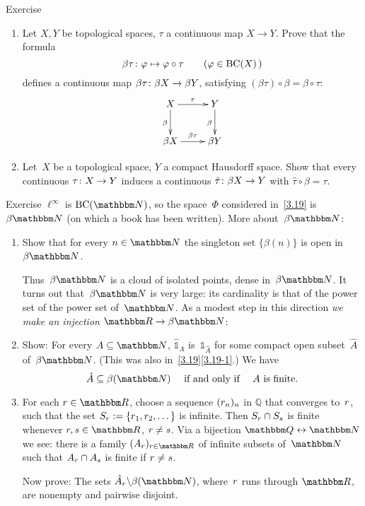 \documentclass[main.tex]{subfiles}
\begin{document}
%
%
\begin{psec}{4.14}{Exercise}
\begin{enumerate}
\item \label{4.14-1}
Let $X,Y$ be topological spaces,
$\tau$ a continuous map $X\rightarrow Y$.
Prove that the formula
\begin{equation*}
\beta\tau\colon\varphi\mapsto\varphi\circ\tau\qquad(\varphi\in\mathrm{BC}(X)\,)
\end{equation*}
defines a continuous map $\beta\tau\colon\beta X\rightarrow\beta Y$,
satisfying $(\beta\tau)\circ\beta=\beta\circ\tau$:
\begin{equation*}
\xymatrix{
X\ar[r]^\tau \ar[d]_\beta& Y\ar[d]_\beta \\
\beta X\ar[r]^{\beta\tau} & \beta Y
}
\end{equation*}
%
\item \label{4.14-2}
Let~$X$ be a topological space, 
$Y$ a compact Hausdorff space.
Show that every continuous $\tau\colon X\rightarrow Y$
induces a continuous $\hat\tau\colon\beta X\rightarrow Y$
with $\hat\tau\circ\beta=\tau$.
\end{enumerate}
\end{psec}
%
%
\begin{psec}{4.15}{Exercise}
$\ell^\infty$ is $\BCont{\N}$,
so the space~$\Phi$ considered in~\ref{3.19} is~$\beta\N$
(on which a book has been written).
More about~$\beta\N$:
\begin{enumerate}
\item \label{4.15-1}
Show that for every $n\in\N$
the singleton set $\{\beta(n)\}$ is open in~$\beta \N$.

Thus~$\beta\N$ is a cloud of isolated points,
dense in~$\beta\N$.
It turns out that~$\beta\N$ is very large:
its cardinality is
that of the power set of the power set of~$\N$.
As a modest step in this direction
\emph{we make an injection} $\R\ra\beta\N$:
\item \label{4.15-2}
Show: For every $A\subseteq \N$, 
$\hat{\mathbb 1}_A$ is~${\mathbb 1}_{\hat A}$
for some compact open subset~$\hat A$ of~$\beta\N$.
(This was also in~\ref{3.19}\ref{3.19-1}.) We have
\begin{equation*}
\hat A \subseteq \beta(\N)
\quad\htam{ if and only if }\quad 
A\htam{ is finite.}
\end{equation*}
%
\item \label{4.14-3}
For each $\sr\in \R$,
choose a sequence $(r_n)_n$ in $\mathbb{Q}$
that converges to~$r$,
such that the set $S_{r}:=\{r_1,r_2,\dotsc\}$
is infinite.
Then $S_{r} \cap S_s$ is finite whenever $\sr,s\in \R$, $r\neq s$.
Via a bijection $\mathbb{Q}\leftrightarrow \N$ we see:
there is a family $(A_\sr)_{\sr\in\R}$
of infinite subsets of~$\N$
such that $A_{r}\cap A_s$ is finite if $r\neq s$.

Now prove:
The sets ${\hat A}_\sr \backslash \beta(\N)$,
where~$r$ runs through $\R$,
are nonempty and pairwise disjoint.
\end{enumerate}
\end{psec}
\end{document}
